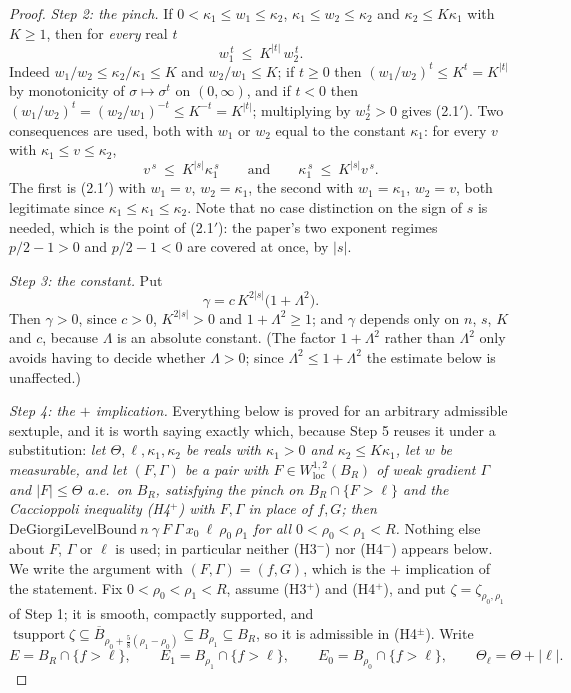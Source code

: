 \begin{proof}
\emph{Step 2: the pinch.}  If $0<\kappa_1\le w_1\le\kappa_2$,
$\kappa_1\le w_2\le\kappa_2$ and $\kappa_2\le K\kappa_1$ with $K\ge1$, then for
\emph{every} real $t$
\[
w_1^{\,t}\ \le\ K^{|t|}\,w_2^{\,t} .
\tag{2.1$'$}
\]
Indeed $w_1/w_2\le\kappa_2/\kappa_1\le K$ and $w_2/w_1\le K$; if $t\ge0$ then
$(w_1/w_2)^t\le K^t=K^{|t|}$ by monotonicity of $\sigma\mapsto\sigma^t$ on
$(0,\infty)$, and if $t<0$ then $(w_1/w_2)^t=(w_2/w_1)^{-t}\le K^{-t}=K^{|t|}$;
multiplying by $w_2^{\,t}>0$ gives (2.1$'$).  Two consequences are used, both
with $w_1$ or $w_2$ equal to the constant $\kappa_1$: for every $v$ with
$\kappa_1\le v\le\kappa_2$,
\[
v^{\,s}\ \le\ K^{|s|}\kappa_1^{\,s}
\qquad\text{and}\qquad
\kappa_1^{\,s}\ \le\ K^{|s|}v^{\,s} .
\tag{2.2$'$}
\]
The first is (2.1$'$) with $w_1=v$, $w_2=\kappa_1$, the second with
$w_1=\kappa_1$, $w_2=v$, both legitimate since $\kappa_1\le\kappa_1\le\kappa_2$.
Note that no case distinction on the sign of $s$ is needed, which is the point
of (2.1$'$): the paper's two exponent regimes $p/2-1>0$ and $p/2-1<0$ are
covered at once, by $|s|$.

\emph{Step 3: the constant.}  Put
\[
\gamma=c\,K^{2|s|}\bigl(1+\Lambda^2\bigr) .
\]
Then $\gamma>0$, since $c>0$, $K^{2|s|}>0$ and $1+\Lambda^2\ge1$; and $\gamma$
depends only on $n$, $s$, $K$ and $c$, because $\Lambda$ is an absolute
constant.  (The factor $1+\Lambda^2$ rather than $\Lambda^2$ only avoids having
to decide whether $\Lambda>0$; since $\Lambda^2\le1+\Lambda^2$ the estimate
below is unaffected.)

\emph{Step 4: the $+$ implication.}  Everything below is proved for an
arbitrary admissible sextuple, and it is worth saying exactly which, because
Step 5 reuses it under a substitution: \emph{let $\Theta,\ell,\kappa_1,\kappa_2$
be reals with $\kappa_1>0$ and $\kappa_2\le K\kappa_1$, let $w$ be measurable,
and let $(F,\Gamma)$ be a pair with $F\in W^{1,2}_{\mathrm{loc}}(B_R)$ of weak
gradient $\Gamma$ and $|F|\le\Theta$ a.e.\ on $B_R$, satisfying the pinch on
$B_R\cap\{F>\ell\}$ and the Caccioppoli inequality (H4$^+$) with $F,\Gamma$ in
place of $f,G$; then
$\mathrm{DeGiorgiLevelBound}\ n\ \gamma\ F\ \Gamma\ x_0\ \ell\ \rho_0\ \rho_1$
for all $0<\rho_0<\rho_1<R$.}  Nothing else about $F$, $\Gamma$ or $\ell$ is
used; in particular neither (H3$^-$) nor (H4$^-$) appears below.  We write the
argument with $(F,\Gamma)=(f,G)$, which is the $+$ implication of the statement.
Fix $0<\rho_0<\rho_1<R$, assume (H3$^+$) and (H4$^+$), and put
$\zeta=\zeta_{\rho_0,\rho_1}$ of Step 1; it is smooth, compactly supported, and
$\operatorname{tsupport}\zeta\subseteq\overline
B_{\rho_0+\frac58(\rho_1-\rho_0)}\subseteq B_{\rho_1}\subseteq B_R$, so it is
admissible in (H4$^\pm$).  Write
\[
E=B_R\cap\{f>\ell\},\qquad E_1=B_{\rho_1}\cap\{f>\ell\},\qquad
E_0=B_{\rho_0}\cap\{f>\ell\},\qquad \Theta_\ell=\Theta+|\ell| .
\]


\end{proof}
